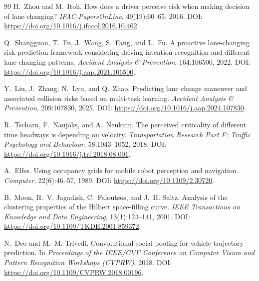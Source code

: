 \documentclass[12pt,a4paper,twoside,openright]{report}
\begin{document}
\begin{thebibliography}{99}
        H.~Zhou and M.~Itoh.
        \newblock How does a driver perceive risk when making decision of lane-changing?
        \newblock \emph{IFAC-PapersOnLine}, 49(19):60--65, 2016.
        \newblock DOI: \url{https://doi.org/10.1016/j.ifacol.2016.10.462}.

        Q.~Shangguan, T.~Fu, J.~Wang, S.~Fang, and L.~Fu.
        \newblock A proactive lane-changing risk prediction framework considering driving intention recognition and different lane-changing patterns.
        \newblock \emph{Accident Analysis \& Prevention}, 164:106500, 2022.
        \newblock DOI: \url{https://doi.org/10.1016/j.aap.2021.106500}.

        Y.~Liu, J.~Zhang, N.~Lyu, and Q.~Zhao.
        \newblock Predicting lane change maneuver and associated collision risks based on multi-task learning.
        \newblock \emph{Accident Analysis \& Prevention}, 209:107830, 2025.
        \newblock DOI: \url{https://doi.org/10.1016/j.aap.2024.107830}.

        R.~Tscharn, F.~Naujoks, and A.~Neukum.
        \newblock The perceived criticality of different time headways is depending on velocity.
        \newblock \emph{Transportation Research Part F: Traffic Psychology and Behaviour}, 58:1043--1052, 2018.
        \newblock DOI: \url{https://doi.org/10.1016/j.trf.2018.08.001}.

        A.~Elfes.
        \newblock Using occupancy grids for mobile robot perception and navigation.
        \newblock \emph{Computer}, 22(6):46--57, 1989.
        \newblock DOI: \url{https://doi.org/10.1109/2.30720}.

        B.~Moon, H.~V. Jagadish, C.~Faloutsos, and J.~H. Saltz.
        \newblock Analysis of the clustering properties of the Hilbert space-filling curve.
        \newblock \emph{IEEE Transactions on Knowledge and Data Engineering}, 13(1):124--141, 2001.
        \newblock DOI: \url{https://doi.org/10.1109/TKDE.2001.859372}.

        N.~Deo and M.~M. Trivedi.
        \newblock Convolutional social pooling for vehicle trajectory prediction.
        \newblock In \emph{Proceedings of the IEEE/CVF Conference on Computer Vision and Pattern Recognition Workshops (CVPRW)}, 2018.
        \newblock DOI: \url{https://doi.org/10.1109/CVPRW.2018.00196}.


\end{thebibliography}
\end{document}

